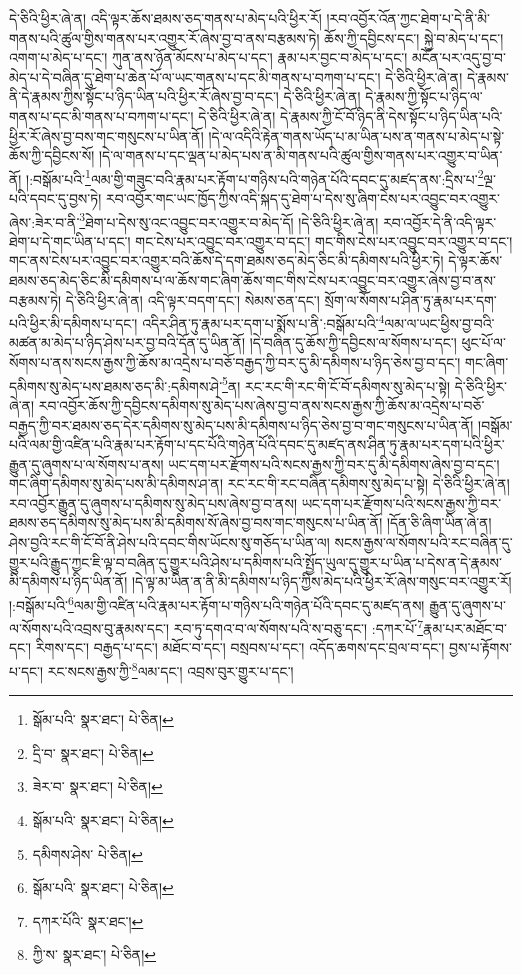 དེ་ཅིའི་ཕྱིར་ཞེ་ན། འདི་ལྟར་ཆོས་ཐམས་ཅད་གནས་པ་མེད་པའི་ཕྱིར་རོ། །རབ་འབྱོར་འོན་ཀྱང་ཐེག་པ་དེ་ནི་མི་གནས་པའི་ཚུལ་གྱིས་གནས་པར་འགྱུར་རོ་ཞེས་བྱ་བ་ནས་བརྩམས་ཏེ། ཆོས་ཀྱི་དབྱིངས་དང་། སྐྱེ་བ་མེད་པ་དང་། འགག་པ་མེད་པ་དང་། ཀུན་ནས་ཉོན་མོངས་པ་མེད་པ་དང་། རྣམ་པར་བྱང་བ་མེད་པ་དང་། མངོན་པར་འདུ་བྱ་བ་མེད་པ་དེ་བཞིན་དུ་ཐེག་པ་ཆེན་པོ་ལ་ཡང་གནས་པ་དང་མི་གནས་པ་བཀག་པ་དང་། དེ་ཅིའི་ཕྱིར་ཞེ་ན། དེ་རྣམས་ནི་དེ་རྣམས་ཀྱིས་སྟོང་པ་ཉིད་ཡིན་པའི་ཕྱིར་རོ་ཞེས་བྱ་བ་དང་། དེ་ཅིའི་ཕྱིར་ཞེ་ན། དེ་རྣམས་ཀྱི་སྟོང་པ་ཉིད་ལ་གནས་པ་དང་མི་གནས་པ་བཀག་པ་དང་། དེ་ཅིའི་ཕྱིར་ཞེ་ན། དེ་རྣམས་ཀྱི་ངོ་བོ་ཉིད་ནི་དེས་སྟོང་པ་ཉིད་ཡིན་པའི་ཕྱིར་རོ་ཞེས་བྱ་བས་གང་གསུངས་པ་ཡིན་ནོ། །དེ་ལ་འདིའི་རྟེན་གནས་ཡོད་པ་མ་ཡིན་པས་ན་གནས་པ་མེད་པ་སྟེ་ཆོས་ཀྱི་དབྱིངས་སོ། །དེ་ལ་གནས་པ་དང་ལྡན་པ་མེད་པས་ན་མི་གནས་པའི་ཚུལ་གྱིས་གནས་པར་འགྱུར་བ་ཡིན་ནོ། །:བསྒོམ་པའི་\footnote{སྒོམ་པའི་  སྣར་ཐང་།  པེ་ཅིན། }ལམ་གྱི་གཟུང་བའི་རྣམ་པར་རྟོག་པ་གཉིས་པའི་གཉེན་པོའི་དབང་དུ་མཛད་ནས་:དྲིས་པ་\footnote{དྲི་བ་  སྣར་ཐང་།  པེ་ཅིན། }ལྔ་པའི་དབང་དུ་བྱས་ཏེ། རབ་འབྱོར་གང་ཡང་ཁྱོད་ཀྱིས་འདི་སྐད་དུ་ཐེག་པ་དེས་སུ་ཞིག་ངེས་པར་འབྱུང་བར་འགྱུར་ཞེས་:ཟེར་བ་ནི་\footnote{ཟེར་བ་  སྣར་ཐང་།  པེ་ཅིན། }ཐེག་པ་དེས་སུ་འང་འབྱུང་བར་འགྱུར་བ་མེད་དོ། །དེ་ཅིའི་ཕྱིར་ཞེ་ན། རབ་འབྱོར་དེ་ནི་འདི་ལྟར་ཐེག་པ་དེ་གང་ཡིན་པ་དང་། གང་ངེས་པར་འབྱུང་བར་འགྱུར་བ་དང་། གང་གིས་ངེས་པར་འབྱུང་བར་འགྱུར་བ་དང་། གང་ནས་ངེས་པར་འབྱུང་བར་འགྱུར་བའི་ཆོས་དེ་དག་ཐམས་ཅད་མེད་ཅིང་མི་དམིགས་པའི་ཕྱིར་ཏེ། དེ་ལྟར་ཆོས་ཐམས་ཅད་མེད་ཅིང་མི་དམིགས་པ་ལ་ཆོས་གང་ཞིག་ཆོས་གང་གིས་ངེས་པར་འབྱུང་བར་འགྱུར་ཞེས་བྱ་བ་ནས་བརྩམས་ཏེ། དེ་ཅིའི་ཕྱིར་ཞེ་ན། འདི་ལྟར་བདག་དང་། སེམས་ཅན་དང་། སྲོག་ལ་སོགས་པ་ཤིན་ཏུ་རྣམ་པར་དག་པའི་ཕྱིར་མི་དམིགས་པ་དང་། འདིར་ཤིན་ཏུ་རྣམ་པར་དག་པ་སྨོས་པ་ནི་:བསྒོམ་པའི་\footnote{སྒོམ་པའི་  སྣར་ཐང་།  པེ་ཅིན། }ལམ་ལ་ཡང་ཕྱིས་བྱ་བའི་མཚན་མ་མེད་པ་ཉིད་ཤེས་པར་བྱ་བའི་དོན་དུ་ཡིན་ནོ། །དེ་བཞིན་དུ་ཆོས་ཀྱི་དབྱིངས་ལ་སོགས་པ་དང་། ཕུང་པོ་ལ་སོགས་པ་ནས་སངས་རྒྱས་ཀྱི་ཆོས་མ་འདྲེས་པ་བཅོ་བརྒྱད་ཀྱི་བར་དུ་མི་དམིགས་པ་ཉིད་ཅེས་བྱ་བ་དང་། གང་ཞིག་དམིགས་སུ་མེད་པས་ཐམས་ཅད་མི་:དམིགས་ཤེ་\footnote{དམིགས་ཤེས་  པེ་ཅིན། }ན། རང་རང་གི་རང་གི་ངོ་བོ་དམིགས་སུ་མེད་པ་སྟེ། དེ་ཅིའི་ཕྱིར་ཞེ་ན། རབ་འབྱོར་ཆོས་ཀྱི་དབྱིངས་དམིགས་སུ་མེད་པས་ཞེས་བྱ་བ་ནས་སངས་རྒྱས་ཀྱི་ཆོས་མ་འདྲེས་པ་བཅོ་བརྒྱད་ཀྱི་བར་ཐམས་ཅད་དེར་དམིགས་སུ་མེད་པས་མི་དམིགས་པ་ཉིད་ཅེས་བྱ་བ་གང་གསུངས་པ་ཡིན་ནོ། །བསྒོམ་པའི་ལམ་གྱི་འཛིན་པའི་རྣམ་པར་རྟོག་པ་དང་པོའི་གཉེན་པོའི་དབང་དུ་མཛད་ནས་ཤིན་ཏུ་རྣམ་པར་དག་པའི་ཕྱིར་རྒྱུན་དུ་ཞུགས་པ་ལ་སོགས་པ་ནས། ཡང་དག་པར་རྫོགས་པའི་སངས་རྒྱས་ཀྱི་བར་དུ་མི་དམིགས་ཞེས་བྱ་བ་དང་། གང་ཞིག་དམིགས་སུ་མེད་པས་མི་དམིགས་ཤ་ན། རང་རང་གི་རང་བཞིན་དམིགས་སུ་མེད་པ་སྟེ། དེ་ཅིའི་ཕྱིར་ཞེ་ན། རབ་འབྱོར་རྒྱུན་དུ་ཞུགས་པ་དམིགས་སུ་མེད་པས་ཞེས་བྱ་བ་ནས། ཡང་དག་པར་རྫོགས་པའི་སངས་རྒྱས་ཀྱི་བར་ཐམས་ཅད་དམིགས་སུ་མེད་པས་མི་དམིགས་སོ་ཞེས་བྱ་བས་གང་གསུངས་པ་ཡིན་ནོ། །དོན་ཅི་ཞིག་ཡིན་ཞེ་ན། ཤེས་བྱའི་རང་གི་ངོ་བོ་ནི་ཤེས་པའི་དབང་གིས་ཡོངས་སུ་གཅོད་པ་ཡིན་ལ། སངས་རྒྱས་ལ་སོགས་པའི་རང་བཞིན་དུ་གྱུར་པའི་རྒྱུད་ཀྱང་ཇི་ལྟ་བ་བཞིན་དུ་གྱུར་པའི་ཤེས་པ་དམིགས་པའི་སྤྱོད་ཡུལ་དུ་གྱུར་པ་ཡིན་པ་དེས་ན་དེ་རྣམས་མི་དམིགས་པ་ཉིད་ཡིན་ནོ། །དེ་ལྟ་མ་ཡིན་ན་ནི་མི་དམིགས་པ་ཉིད་ཀྱིས་མེད་པའི་ཕྱིར་རོ་ཞེས་གསུང་བར་འགྱུར་རོ། །:བསྒོམ་པའི་\footnote{སྒོམ་པའི་  སྣར་ཐང་།  པེ་ཅིན། }ལམ་གྱི་འཛིན་པའི་རྣམ་པར་རྟོག་པ་གཉིས་པའི་གཉེན་པོའི་དབང་དུ་མཛད་ནས། རྒྱུན་དུ་ཞུགས་པ་ལ་སོགས་པའི་འབྲས་བུ་རྣམས་དང་། རབ་ཏུ་དགའ་བ་ལ་སོགས་པའི་ས་བཅུ་དང་། :དཀར་པོ་\footnote{དཀར་པོའི་  སྣར་ཐང་། }རྣམ་པར་མཐོང་བ་དང་། རིགས་དང་། བརྒྱད་པ་དང་། མཐོང་བ་དང་། བསྲབས་པ་དང་། འདོད་ཆགས་དང་བྲལ་བ་དང་། བྱས་པ་རྟོགས་པ་དང་། རང་སངས་རྒྱས་ཀྱི་\footnote{ཀྱི་ས་  སྣར་ཐང་།  པེ་ཅིན། }ལམ་དང་། འབྲས་བུར་གྱུར་པ་དང་། 